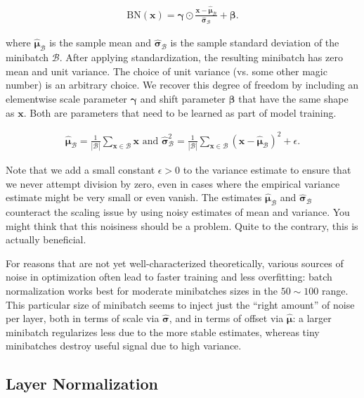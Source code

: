 \documentclass[a4paper,12pt]{article}
\theoremstyle{definition}
\begin{document}
\begin{align*}
    \mathrm{BN}(\mathbf{x}) = \boldsymbol{\gamma} \odot \frac{\mathbf{x} - \hat{\boldsymbol{\mu}}_\mathcal{B}}{\hat{\boldsymbol{\sigma}}_\mathcal{B}} + \boldsymbol{\beta}.
\end{align*}

where $\hat{\boldsymbol{\mu}}_\mathcal{B}$ is the sample mean and $\hat{\boldsymbol{\sigma}}_\mathcal{B}$
is the sample standard deviation of the minibatch $\mathcal{B}$. After applying standardization, the resulting minibatch has zero mean and unit variance. The choice of unit variance
(vs. some other magic number) is an arbitrary choice. We recover this degree of freedom by including an elementwise scale parameter $\boldsymbol{\gamma}$ and shift parameter $\boldsymbol{\beta}$
that have the same shape as $\mathbf{x}$. Both are parameters that need to be learned as part of model training.

\begin{align*}
    \hat{\boldsymbol{\mu}}_\mathcal{B} = \frac{1}{|\mathcal{B}|} \sum_{\mathbf{x} \in \mathcal{B}} \mathbf{x}
    \text{ and }
    \hat{\boldsymbol{\sigma}}_\mathcal{B}^2 = \frac{1}{|\mathcal{B}|} \sum_{\mathbf{x} \in \mathcal{B}} (\mathbf{x} - \hat{\boldsymbol{\mu}}_{\mathcal{B}})^2 + \epsilon.
\end{align*}

Note that we add a small constant $\epsilon > 0$ to the variance estimate to ensure that we never attempt division by zero, even in cases where the empirical variance estimate
might be very small or even vanish. The estimates $\hat{\boldsymbol{\mu}}_\mathcal{B}$ and ${\hat{\boldsymbol{\sigma}}_\mathcal{B}}$
counteract the scaling issue by using noisy estimates of mean and variance. You might think that this noisiness should be a problem. Quite to the contrary, this is actually beneficial.

For reasons that are not yet well-characterized theoretically, various sources of noise in optimization often lead to faster training and less overfitting:
batch normalization works best for moderate minibatches sizes in the $50 \sim 100$
range. This particular size of minibatch seems to inject just the “right amount” of noise per layer, both in terms of scale via $\hat{\boldsymbol{\sigma}}$, and in terms of offset
via $\hat{\boldsymbol{\mu}}$: a larger minibatch regularizes less due to the more stable estimates, whereas tiny minibatches destroy useful signal due to high variance.

\subsection*{Layer Normalization}
\end{document}
